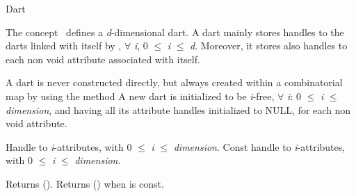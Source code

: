 \ccRefPageBegin
\begin{ccRefConcept}{Dart}

\ccDefinition
  
The concept \ccRefName\ defines a \emph{d}-dimensional dart.  A dart mainly
stores handles to the darts linked with itself by \betai{}, $\forall$
\emph{i}, 0 $\leq$ \emph{i} $\leq$ \emph{d}. Moreover, it stores also handles to each
non void attribute associated with itself.


\ccCreation 
{} 
A dart  is never constructed directly, but always created
within a combinatorial map  by using the method
 A new dart is initialized to be \emph{i}-free,
$\forall$ \emph{i}: 0 $\leq$ \emph{i} $\leq$ \emph{dimension}, and having all its attribute
handles initialized to NULL, for each non void attribute.

\ccConstants
{}

\ccTypes
{}
%
\ccGlue
{}

    {Handle to \emph{i}-attributes, with 0 $\leq$ \emph{i} $\leq$ \emph{dimension}.}
\ccGlue
{}
    {Const handle to \emph{i}-attributes, with 0 $\leq$ \emph{i} $\leq$ \emph{dimension}.}

%
         {Returns \betai{}().
          }
\ccGlue
{}
         {Returns \betai{}() when  is const.
          }


\end{ccRefConcept}
